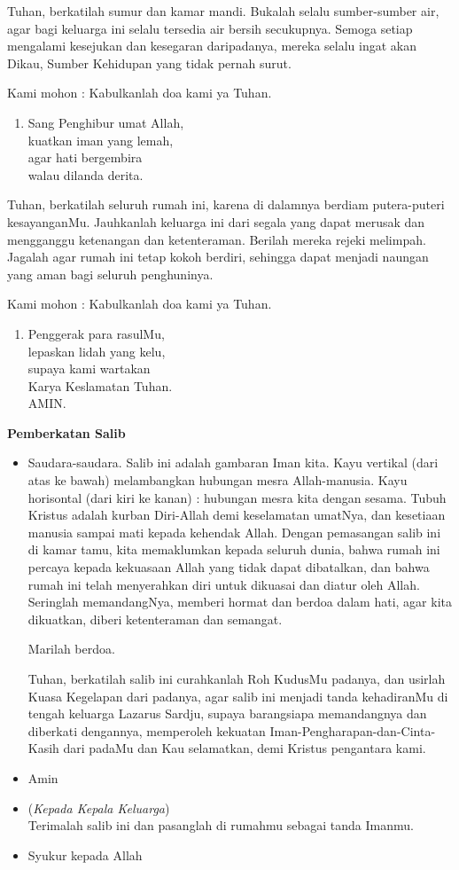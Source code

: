 \documentclass[12pt,twoside]{book}
\makeatletter
\newcommand{\subjudul}[1]{%
  {\parindent \z@ \normalfont
    \interlinepenalty\@M \bfseries #1\par\nobreak \vskip 20\p@ }}
\renewenvironment{description}
               {\list{}{\labelwidth\z@ \itemindent-\leftmargin
                        \let\makelabel\descriptionlabel}}
               {\endlist}
\renewcommand*\descriptionlabel[1]{\hspace\labelsep 
                                \normalfont\bfseries #1 }
\newcommand{\doa}[2]{%
  \begin{description}
  \item[Doa untuk #1] #2
   
   Kami mohon : Kabulkanlah doa kami ya Tuhan.
  \end{description}
}
\newcommand{\bait}[1]{%
  \begin{enumerate}
  \slshape
  \setcounter{enumi}{\value{urut}}
  \item #1
  \setcounter{urut}{\value{enumi}}
  \end{enumerate}	
}
\newcommand{\BU}[1]{\begin{itemize} \item[U:] #1 \end{itemize}}
\newcommand{\BI}[1]{\begin{itemize} \item[I:] #1 \end{itemize}}
\newcommand{\keluarga}{Lazarus Sardju\xspace}
\makeatother
\begin{document}
\doa{sumur dan kamar mandi}{
Tuhan, berkatilah sumur dan kamar mandi. Bukalah selalu sumber-sumber air, agar bagi keluarga ini selalu tersedia air bersih secukupnya. Semoga setiap mengalami kesejukan dan kesegaran daripadanya, mereka selalu ingat akan Dikau, Sumber Kehidupan yang tidak pernah surut.}

\bait{Sang Penghibur umat Allah, \\kuatkan iman yang lemah,\\ agar hati bergembira \\walau dilanda derita.}

\doa{seluruh dan sekeliling rumah}{
Tuhan, berkatilah seluruh rumah ini, karena di dalamnya berdiam putera-puteri kesayanganMu. Jauhkanlah keluarga ini dari segala yang dapat merusak dan mengganggu ketenangan dan ketenteraman. Berilah mereka rejeki melimpah. Jagalah agar rumah ini tetap kokoh berdiri, sehingga dapat menjadi naungan yang aman bagi seluruh penghuninya.}

\bait{Penggerak para rasulMu,\\ lepaskan lidah yang kelu,\\ supaya kami wartakan\\ Karya Keslamatan Tuhan.\\ AMIN.}

\subjudul{Pemberkatan Salib}
\BI{Saudara-saudara. Salib ini adalah gambaran Iman kita. Kayu vertikal (dari atas ke bawah) melambangkan hubungan mesra Allah-manusia. Kayu horisontal (dari kiri ke kanan) : hubungan mesra kita dengan sesama. Tubuh Kristus adalah kurban Diri-Allah demi keselamatan umatNya, dan kesetiaan manusia sampai mati kepada kehendak Allah. Dengan pemasangan salib ini di kamar tamu, kita memaklumkan kepada seluruh dunia, bahwa rumah ini percaya kepada kekuasaan Allah yang tidak dapat dibatalkan, dan bahwa rumah ini telah menyerahkan diri untuk dikuasai dan diatur oleh Allah. Seringlah memandangNya, memberi hormat dan berdoa dalam hati, agar kita dikuatkan, diberi ketenteraman dan semangat.

Marilah berdoa.

Tuhan, berkatilah salib ini \Cross {~}curahkanlah Roh KudusMu padanya, dan usirlah Kuasa Kegelapan dari padanya, agar salib ini menjadi tanda kehadiranMu di tengah keluarga \keluarga , supaya barangsiapa memandangnya dan diberkati dengannya, memperoleh kekuatan Iman-Pengharapan-dan-Cinta-Kasih dari padaMu dan Kau selamatkan, demi Kristus pengantara kami.}
\BU{Amin}
\BI{(\textit{Kepada Kepala Keluarga})\\
Terimalah salib ini dan pasanglah di rumahmu sebagai tanda Imanmu.}
\BU{Syukur kepada Allah}
\end{document}
